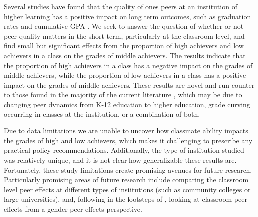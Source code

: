 \documentclass[12pt,letterpaper,english,fleqn,titlepage]{article}
\begin{document}

Several studies have found that the quality of ones peers at an institution of higher learning has a positive impact on long term outcomes, such as graduation rates and cumulative GPA \citep{smith2015new,luppino2015college,ost2010role}.
We seek to answer the question of whether or not peer quality matters in the short term, particularly at the classroom level, and find small but significant effects from the proportion of high achievers and low achievers in a class on the grades of middle achievers. 
The results indicate that the proportion of high achievers in a class has a negative impact on the grades of middle achievers, while the proportion of low achievers in a class has a positive impact on the grades of middle achievers. 
These results are novel and run counter to those found in the majority of the current literature \citep{kang2007classroom,carman2012classroom,burke2013classroom,schlosser2008inside,lavy2012good}, which may be due to changing peer dynamics from K-12 education to higher education, grade curving occurring in classes at the institution, or a combination of both.
 
Due to data limitations we are unable to uncover how classmate ability impacts the grades of high and low achievers, which makes it challenging to prescribe any practical policy recommendations.
Additionally, the type of institution studied was relatively unique, and it is not clear how generalizable these results are. 
Fortunately, these study limitations create promising avenues for future research.
Particularly promising areas of future research include comparing the classroom level peer effects at different types of institutions (such as community colleges or large universities), and, following in the footsteps of \citet{oosterbeek2014gender}, looking at classroom peer effects from a gender peer effects perspective.
       
\newpage{}
\pagestyle{plain}
\singlespacing



\clearpage{}

\pagestyle{fancy}
\begin{appendices}



\end{appendices}
\end{document}
